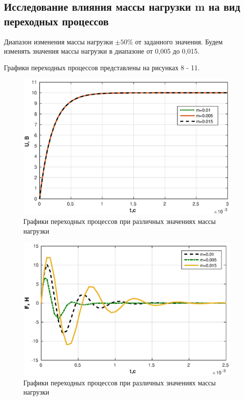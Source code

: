 \documentclass[12pt, a4paper]{article}
\begin{document}
\newpage
\begin{center}
\section{Исследование влияния массы нагрузки m на вид переходных процессов} 
\end{center}
 \par 
Диапазон изменения массы нагрузки  $\pm50\%$ от заданного значения. Будем изменять значения массы нагрузки в диапазоне от 0,005 до 0,015.
\par Графики переходных процессов представлены на рисунках 8 - 11.

\begin{figure}[H]
\centering
\includegraphics[width = \textwidth]{1/U2.eps}
\caption{Графики переходных процессов при различных значениях массы нагрузки}
\end{figure}

\begin{figure}[H]
\centering
\includegraphics[width = \textwidth]{1/F2.eps}
\caption{Графики переходных процессов при различных значениях массы нагрузки}
\end{figure}
\end{document}
